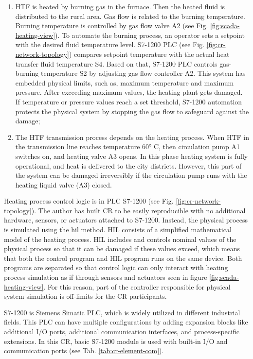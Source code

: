 \begin{enumerate}
	\item HTF is heated by burning gas in the furnace. Then the heated fluid is distributed to the rural area. Gas flow is related to the burning temperature. Burning temperature is controlled by gas flow valve A2 (see Fig. \ref{fig:scada-heating-view}). To automate the burning process, an operator sets a setpoint with the desired fluid temperature level. S7-1200 PLC (see Fig. \ref{fig:cr-network-topology}) compares setpoint temperature with the actual heat transfer fluid temperature S4. Based on that, S7-1200 PLC controls gas-burning temperature S2  by adjusting gas flow controller A2. This system has embedded physical limits, such as, maximum temperature and maximum pressure. After exceeding maximum values, the heating plant gets damaged. If temperature or pressure values reach a set threshold, S7-1200 automation protects  the physical system by stopping the gas flow to safeguard against the damage;
	
	\item The HTF transmission process depends on the heating process. When HTF in the transmission line reaches temperature 60° C, then circulation pump A1 switches on, and heating valve A3 opens. In this phase heating system is fully operational, and heat is delivered to the city districts. However, this part of the system can be damaged irreversibly if the circulation pump runs with the heating liquid valve (A3) closed.
\end{enumerate}

Heating process control logic is in PLC S7-1200 (see Fig. \ref{fig:cr-network-topology}). The author has built CR to be easily reproducible with no additional hardware, sensors, or actuators attached to S7-1200. Instead, the physical process is simulated using the \gls*{hil} method. HIL consists of a simplified mathematical model of the heating process. HIL includes and controls nominal values of the physical process so that it can be damaged if these values exceed, which means that both the control program and HIL program runs on the same device. Both programs are separated so that control logic can only interact with heating process simulation as if through sensors and actuators seen in figure \ref{fig:scada-heating-view}. For this reason, part of the controller responsible for physical system simulation is off-limits for the CR participants.

S7-1200 is Siemens Simatic PLC, which is widely utilized in different industrial fields. This PLC can have multiple configurations by adding expansion blocks like additional I/O ports, additional communication interfaces, and process-specific extensions. In this CR, basic S7-1200 module is used with built-in I/O and communication ports (see Tab. \ref{tab:cr-element-com}).

